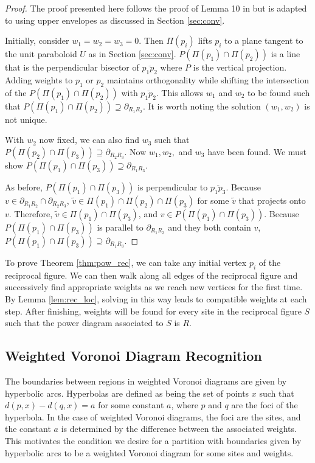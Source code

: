 \documentclass[a4paper, 11pt]{article}
\begin{document}
\begin{proof}
  The proof presented here follows the proof of Lemma 10 in \cite{ash-bolker} but is adapted to using upper envelopes as discussed in Section
  \ref{sec:conv}.

  Initially, consider $w_1 = w_2 = w_3 = 0$. Then $\Pi(p_i)$ lifts $p_i$ to a plane tangent to the unit paraboloid $U$ as in Section \ref{sec:conv}.
  $P(\Pi(p_1) \cap \Pi(p_2))$ is a line that is the perpendicular bisector of $\overline{p_1 p_2}$ where $P$ is the vertical projection. Adding weights to $p_1$
  or $p_2$ maintains orthogonality while shifting the intersection of the $P(\Pi(p_1) \cap \Pi(p_2))$ with $\overline{p_1 p_2}$. This
  allows $w_1$ and $w_2$ to be found such that $P(\Pi(p_1) \cap \Pi(p_2)) \supseteq \partial_{R_1 R_2}$. It is worth noting the solution $(w_1, w_2)$
  is not unique.

  With $w_2$ now fixed, we can also find $w_3$ such that $P(\Pi(p_2) \cap \Pi(p_3)) \supseteq \partial_{R_2 R_3}$. Now $w_1, w_2,$
  and $w_3$ have been found. We must show $P(\Pi(p_1) \cap \Pi(p_3)) \supseteq \partial_{R_1 R_3}$.

  As before, $P(\Pi(p_1) \cap \Pi(p_3))$ is perpendicular to $\overline{p_1 p_3}$. Because $v \in \partial_{R_1 R_2} \cap \partial_{R_2
  R_3}$, $\tilde{v} \in \Pi(p_1) \cap \Pi(p_2) \cap \Pi(p_3)$ for some $\tilde{v}$ that projects onto $v$. Therefore, $\tilde{v} \in \Pi(p_1) \cap
  \Pi(p_3)$, and $v \in P(\Pi(p_1) \cap \Pi(p_3))$. Because $P(\Pi(p_1) \cap \Pi(p_3))$ is parallel to $\partial_{R_1 R_3}$ and they both contain $v$, $P(\Pi(p_1) \cap \Pi(p_3)) \supseteq \partial_{R_1 R_3}$.
\end{proof}

To prove Theorem \ref{thm:pow_rec}, we can take any initial vertex $p_i$ of the reciprocal figure. We can then walk along all edges of the reciprocal
figure and successively find appropriate weights as we reach new vertices for the first time. By Lemma \ref{lem:rec_loc}, solving in this way leads to
compatible weights at each step. After finishing, weights will be found for every site in the reciprocal figure $S$ such that the power diagram
associated to $S$ is $R$.

\subsection{Weighted Voronoi Diagram Recognition}

The boundaries between regions in weighted Voronoi diagrams are given by hyperbolic arcs. Hyperbolas are defined as being the set of points $x$ such
that $d(p,x) - d(q,x) = a$ for some constant $a$, where $p$ and $q$ are the foci of the hyperbola. In the case of weighted Voronoi diagrams, the foci
are the sites, and the constant $a$ is determined by the difference between the associated weights. This motivates the condition we desire for a
partition with boundaries given by hyperbolic arcs to be a weighted Voronoi diagram for some sites and weights.
\end{document}
